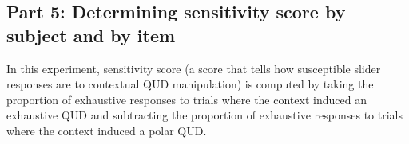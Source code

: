 \documentclass[]{article}
\newenvironment{Shaded}{\begin{snugshade}}{\end{snugshade}}
\newcommand{\KeywordTok}[1]{\textcolor[rgb]{0.13,0.29,0.53}{\textbf{#1}}}
\newcommand{\StringTok}[1]{\textcolor[rgb]{0.31,0.60,0.02}{#1}}
\newcommand{\CommentTok}[1]{\textcolor[rgb]{0.56,0.35,0.01}{\textit{#1}}}
\newcommand{\OperatorTok}[1]{\textcolor[rgb]{0.81,0.36,0.00}{\textbf{#1}}}
\newcommand{\NormalTok}[1]{#1}
\begin{document}
\begin{Shaded}
\end{Shaded}

\subsection{Part 5: Determining sensitivity score by subject and by
item}\label{part-5-determining-sensitivity-score-by-subject-and-by-item}

In this experiment, sensitivity score (a score that tells how
susceptible slider responses are to contextual QUD manipulation) is
computed by taking the proportion of exhaustive responses to trials
where the context induced an exhaustive QUD and subtracting the
proportion of exhaustive responses to trials where the context induced a
polar QUD.
\end{document}
